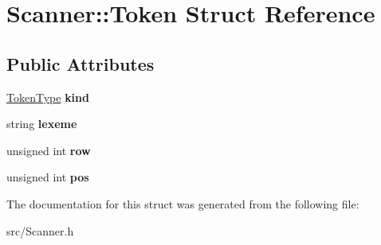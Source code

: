 \hypertarget{struct_scanner_1_1_token}{}\section{Scanner\+:\+:Token Struct Reference}
\label{struct_scanner_1_1_token}
\subsection*{Public Attributes}
\begin{DoxyCompactItemize}
\item 
\hypertarget{struct_scanner_1_1_token_ac1231a1f9706c2fef3c67ca8670d0174}{}\label{struct_scanner_1_1_token_ac1231a1f9706c2fef3c67ca8670d0174} 
\hyperlink{class_scanner_a1d588ca5cfd26bdff0e59b437da5b166}{Token\+Type} {\bfseries kind}
\item 
\hypertarget{struct_scanner_1_1_token_a5a234137ce0843189e909f7146945efe}{}\label{struct_scanner_1_1_token_a5a234137ce0843189e909f7146945efe} 
string {\bfseries lexeme}
\item 
\hypertarget{struct_scanner_1_1_token_af83dcc1337613ad1c8d80aec9d8123bb}{}\label{struct_scanner_1_1_token_af83dcc1337613ad1c8d80aec9d8123bb} 
unsigned int {\bfseries row}
\item 
\hypertarget{struct_scanner_1_1_token_a0f0616aadf99dfa1707c6beee4c7453c}{}\label{struct_scanner_1_1_token_a0f0616aadf99dfa1707c6beee4c7453c} 
unsigned int {\bfseries pos}
\end{DoxyCompactItemize}


The documentation for this struct was generated from the following file\+:\begin{DoxyCompactItemize}
\item 
src/Scanner.\+h\end{DoxyCompactItemize}
